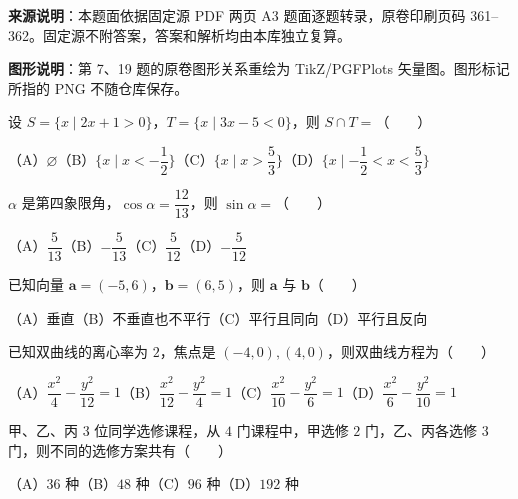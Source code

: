 


\begin{gktip}
\textbf{来源说明}：本题面依据固定源 PDF 两页 A3 题面逐题转录，原卷印刷页码 361–362。固定源不附答案，答案和解析均由本库独立复算。

\textbf{图形说明}：第 7、19 题的原卷图形关系重绘为 TikZ/PGFPlots 矢量图。图形标记所指的 PNG 不随仓库保存。
\end{gktip}


\begin{question}
设 $S=\{x\mid2x+1>0\}$，$T=\{x\mid3x-5<0\}$，则 $S\cap T=$\mbox{（　　）}

（A）$\varnothing$\quad（B）$\{x\mid x<-\dfrac12\}$\quad（C）$\{x\mid x>\dfrac53\}$\quad（D）$\{x\mid-\dfrac12<x<\dfrac53\}$

\end{question}
\begin{question}
$\alpha$ 是第四象限角，$\cos\alpha=\dfrac{12}{13}$，则 $\sin\alpha=$\mbox{（　　）}

（A）$\dfrac5{13}$\quad（B）$-\dfrac5{13}$\quad（C）$\dfrac5{12}$\quad（D）$-\dfrac5{12}$

\end{question}
\begin{question}
已知向量 $\boldsymbol a=(-5,6)$，$\boldsymbol b=(6,5)$，则 $\boldsymbol a$ 与 $\boldsymbol b$\mbox{（　　）}

（A）垂直\quad（B）不垂直也不平行\quad（C）平行且同向\quad（D）平行且反向

\end{question}
\begin{question}
已知双曲线的离心率为 $2$，焦点是 $(-4,0),(4,0)$，则双曲线方程为\mbox{（　　）}

（A）$\dfrac{x^2}{4}-\dfrac{y^2}{12}=1$\quad（B）$\dfrac{x^2}{12}-\dfrac{y^2}{4}=1$\quad（C）$\dfrac{x^2}{10}-\dfrac{y^2}{6}=1$\quad（D）$\dfrac{x^2}{6}-\dfrac{y^2}{10}=1$

\end{question}
\begin{question}
甲、乙、丙 $3$ 位同学选修课程，从 $4$ 门课程中，甲选修 $2$ 门，乙、丙各选修 $3$ 门，则不同的选修方案共有\mbox{（　　）}

（A）$36$ 种\quad（B）$48$ 种\quad（C）$96$ 种\quad（D）$192$ 种

\end{question}
